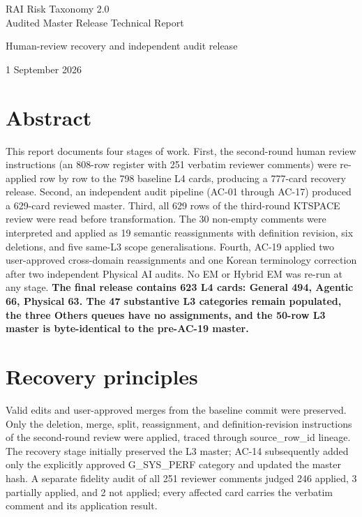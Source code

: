 \documentclass[11pt,a4paper]{article}
\begin{document}
\begin{titlepage}
\thispagestyle{empty}
\vspace*{42mm}
\begin{center}
{\LARGE RAI Risk Taxonomy 2.0\\[3pt]Audited Master Release Technical Report}\par
\vspace{9mm}
{\large Human-review recovery and independent audit release}\par
\vspace{6mm}
{\large 1 September 2026}\par
\vspace{9mm}
\end{center}
\end{titlepage}
\par\section*{Abstract}
This report documents four stages of work. First, the second-round human review instructions (an 808-row register with 251 verbatim reviewer comments) were re-applied row by row to the 798 baseline L4 cards, producing a 777-card recovery release. Second, an independent audit pipeline (AC-01 through AC-17) produced a 629-card reviewed master. Third, all 629 rows of the third-round KTSPACE review were read before transformation. The 30 non-empty comments were interpreted and applied as 19 semantic reassignments with definition revision, six deletions, and five same-L3 scope generalisations. Fourth, AC-19 applied two user-approved cross-domain reassignments and one Korean terminology correction after two independent Physical AI audits. No EM or Hybrid EM was re-run at any stage. \textbf{The final release contains 623 L4 cards: General 494, Agentic 66, Physical 63. The 47 substantive L3 categories remain populated, the three Others queues have no assignments, and the 50-row L3 master is byte-identical to the pre-AC-19 master.}
\par\section{Recovery principles}
Valid edits and user-approved merges from the baseline commit were preserved. Only the deletion, merge, split, reassignment, and definition-revision instructions of the second-round review were applied, traced through source\_row\_id lineage. The recovery stage initially preserved the L3 master; AC-14 subsequently added only the explicitly approved G\_SYS\_PERF category and updated the master hash. A separate fidelity audit of all 251 reviewer comments judged 246 applied, 3 partially applied, and 2 not applied; every affected card carries the verbatim comment and its application result.
\end{document}
